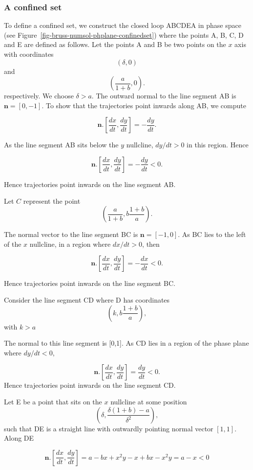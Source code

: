 \documentclass[
  letterpaper,
  DIV=11,
  numbers=noendperiod]{scrreprt}
\begin{document}
\subsubsection{A confined set}\label{a-confined-set}

To define a confined set, we construct the closed loop ABCDEA in phase
space (see Figure~\ref{fig-bruss-numsol-phplane-confinedset}) where the
points A, B, C, D and E are defined as follows. Let the points A and B
be two points on the \(x\) axis with coordinates \[
(\delta,0)
\] and \[
\left(\frac{a}{1+b},0\right).
\] respectively. We choose \(\delta>a\). The outward normal to the line
segment AB is \(\mathbf{n}=[0,-1]\). To show that the trajectories point
inwards along AB, we compute

\[
\mathbf{n}.\left[\frac{dx}{dt},\frac{dy}{dt}\right] = -\frac{dy}{dt}.
\]

As the line segment AB sits below the \(y\) nullcline, \(dy/dt>0\) in
this region. Hence

\[
\mathbf{n}.\left[\frac{dx}{dt},\frac{dy}{dt}\right] = -\frac{dy}{dt}<0.
\]

Hence trajectories point inwards on the line segment AB.

Let \(C\) represent the point \[
\left(\frac{a}{1+b},b\frac{1+b}{a}\right).
\]

The normal vector to the line segment BC is \(\mathbf{n}=[-1,0]\). As BC
lies to the left of the \(x\) nullcline, in a region where \(dx/dt>0\),
then

\[
\mathbf{n}.\left[\frac{dx}{dt},\frac{dy}{dt}\right] = -\frac{dx}{dt}<0.
\]

Hence trajectories point inwards on the line segment BC.

Consider the line segment CD where D has coordinates \[
\left(k,b\frac{1+b}{a}\right),
\] with \(k>a\)

The normal to this line segment is {[}0,1{]}. As CD lies in a region of
the phase plane where \(dy/dt<0\),

\[
\mathbf{n}.\left[\frac{dx}{dt},\frac{dy}{dt}\right] = \frac{dy}{dt}<0.
\] Hence trajectories point inwards on the line segment CD.

Let E be a point that sits on the \(x\) nullcline at some position \[
\left(\delta,\frac{\delta(1+b)-a}{\delta^2}\right),
\] such that DE is a straight line with outwardly pointing normal vector
\([1,1]\). Along DE

\[
\mathbf{n}.\left[\frac{dx}{dt},\frac{dy}{dt}\right] =   a-bx+x^2y-x + bx-x^2y = a-x<0
\]
\end{document}
